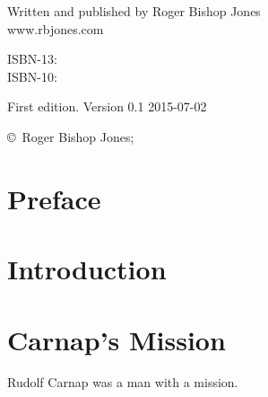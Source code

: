 \begin{titlepage}
\maketitle

\hspace{2in}

\vfill

\begin{centering}

{\small

Written and published by Roger Bishop Jones\\
www.rbjones.com\\

\vspace{0.2in}

ISBN-13: \\
ISBN-10: 

\vspace{0.2in}

}%
{\scriptsize

First edition. \hfil Version 0.1 \hfil 2015-07-02

\vspace{0.2in}

\copyright\ Roger Bishop Jones;

}%

\end{centering}

\thispagestyle{empty}

\end{titlepage}

{\parskip=0pt\tableofcontents}


\chapter*{Preface}\label{Preface}

\mainmatter

\chapter{Introduction}

\chapter{Carnap's Mission}

Rudolf Carnap was a man with a mission.

